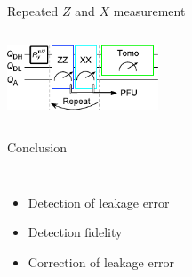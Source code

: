 \documentclass[xcolor={table}]{beamer}
\begin{document}
\begin{frame}{Repeated $Z$ and $X$ measurement}
  \vspace{-0.9cm}
  \begin{center}
    \begin{columns}
      \column{4.5cm}
      \begin{center}
        \includegraphics[width=4.5cm]{repeat_zx}
      \end{center}
      \column{7.5cm}
      \begin{center}
      \end{center}
    \end{columns}
  \end{center}
\end{frame}

\begin{frame}{Conclusion}
  \begin{center}
    \begin{columns}
      \column{8cm}
      \begin{itemize}
      \item Detection of leakage error
      \item Detection fidelity
      \item Correction of leakage error
      \end{itemize}
    \end{columns}
  \end{center}
\end{frame}
\end{document}
